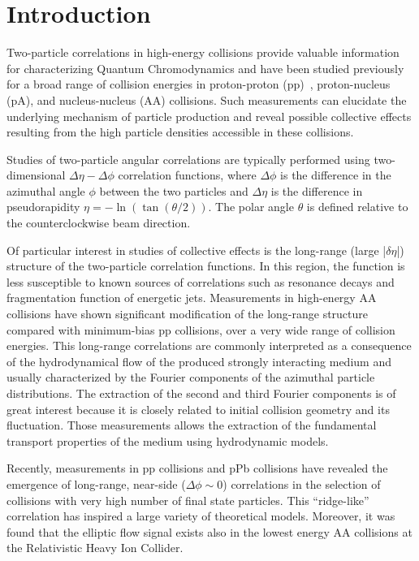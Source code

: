 \section{Introduction}

Two-particle correlations in high-energy collisions provide valuable information for characterizing Quantum Chromodynamics and have been studied previously for a broad range of collision energies in proton-proton (pp)~\cite{Khachatryan:2010gv}, proton-nucleus (pA), and nucleus-nucleus (AA) collisions. Such measurements can elucidate the underlying mechanism of particle production and reveal possible collective effects resulting from the high particle densities accessible in these collisions.

Studies of two-particle angular correlations are typically performed using two-dimensional $\Delta\eta-\Delta\phi$ correlation functions, where $\Delta\phi$ is the difference in the azimuthal angle $\phi$ between the two particles and $\Delta\eta$ is the difference in pseudorapidity $\eta = -\ln(\tan(\theta/2))$. The polar angle $\theta$ is defined relative to the counterclockwise beam direction.

Of particular interest in studies of collective effects is the long-range (large |$\delta\eta$|) structure of the two-particle correlation functions. In this region, the function is less susceptible to known sources of correlations such as resonance decays and fragmentation function of energetic jets. Measurements in high-energy AA collisions have shown significant modification of the long-range structure compared with minimum-bias pp collisions, over a very wide range of collision energies. This long-range correlations are commonly interpreted as a consequence of the hydrodynamical flow of the produced strongly interacting medium and usually characterized by the Fourier components of the azimuthal particle distributions. The extraction of the second and third Fourier components is of great interest because it is closely related to initial collision geometry and its fluctuation. Those measurements allows the extraction of the fundamental transport properties of the medium using hydrodynamic models.

Recently, measurements in pp collisions and pPb collisions have revealed the emergence of long-range, near-side ($\Delta\phi\sim 0$) correlations in the selection of collisions with very high number of final state particles. This ``ridge-like'' correlation has inspired a large variety of theoretical models. Moreover, it was found that the elliptic flow signal exists also in the lowest energy AA collisions at the Relativistic Heavy Ion Collider. 
